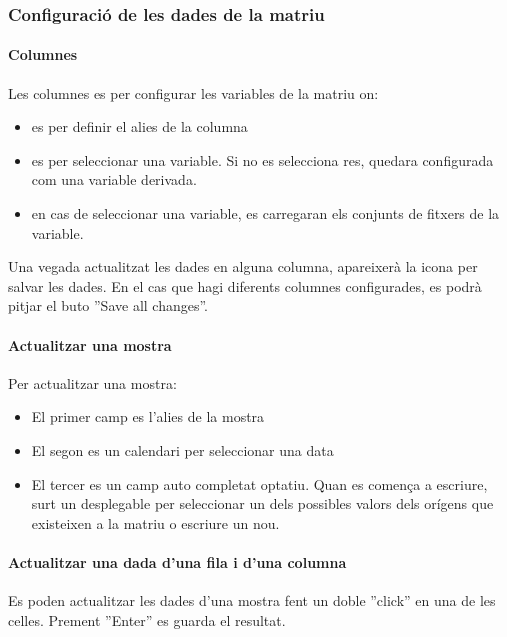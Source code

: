 \subsubsection{Configuració de les dades de la matriu}
\paragraph*{Columnes} Les columnes es per configurar les variables de la matriu on:
\begin{itemize}
\item \iconalias es per definir el alies de la columna
\item \iconvariable es per seleccionar una variable. Si no es selecciona res, quedara configurada com una variable derivada.
\item \iconseason en cas de seleccionar una variable, es carregaran els conjunts de fitxers de la variable.
\end{itemize}
Una vegada actualitzat les dades en alguna columna, apareixerà la icona \iconedit per salvar les dades. En el cas que hagi diferents columnes configurades, es podrà pitjar el buto ''Save all changes''.

\paragraph*{Actualitzar una mostra} Per actualitzar una mostra:
\begin{itemize}
\item El primer camp es l'alies de la mostra
\item El segon es un calendari per seleccionar una data
\item El tercer es un camp auto completat optatiu. Quan es comença a escriure, surt un desplegable per seleccionar un dels possibles valors dels orígens que existeixen a la matriu o escriure un nou.
\end{itemize}

\paragraph*{Actualitzar una dada d'una fila i d'una columna} Es poden actualitzar les dades d'una mostra fent un doble ''click'' en una de les celles. Prement ''Enter'' es guarda el resultat.



